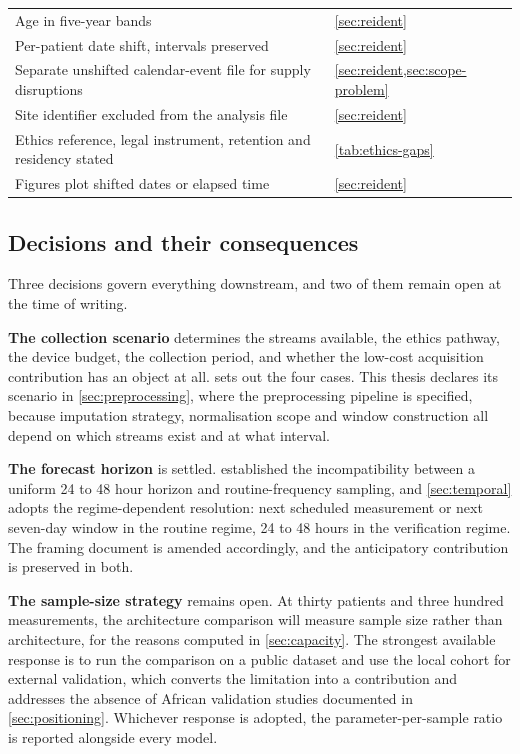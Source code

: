 \documentclass[12pt,a4paper,oneside]{report}
\begin{document}
\begin{table}[htbp]
\begin{tabularx}{\textwidth}{@{}X >{\raggedright\arraybackslash}p{5.5cm}@{}}
Age in five-year bands & \cref{sec:reident} \\
Per-patient date shift, intervals preserved & \cref{sec:reident} \\
Separate unshifted calendar-event file for supply disruptions & \cref{sec:reident,sec:scope-problem} \\
Site identifier excluded from the analysis file & \cref{sec:reident} \\
Ethics reference, legal instrument, retention and residency stated & \cref{tab:ethics-gaps} \\
Figures plot shifted dates or elapsed time & \cref{sec:reident} \\
\bottomrule
\end{tabularx}
\end{table}

\subsection{Decisions and their consequences}\label{sec:decisions}

Three decisions govern everything downstream, and two of them remain open at the time of writing.

\textbf{The collection scenario} determines the streams available, the ethics pathway, the device budget, the collection period, and whether the low-cost acquisition contribution has an object at all.  sets out the four cases. This thesis declares its scenario in \cref{sec:preprocessing}, where the preprocessing pipeline is specified, because imputation strategy, normalisation scope and window construction all depend on which streams exist and at what interval.

\textbf{The forecast horizon} is settled.  established the incompatibility between a uniform 24 to 48 hour horizon and routine-frequency sampling, and \cref{sec:temporal} adopts the regime-dependent resolution: next scheduled measurement or next seven-day window in the routine regime, 24 to 48 hours in the verification regime. The framing document is amended accordingly, and the anticipatory contribution is preserved in both.

\textbf{The sample-size strategy} remains open. At thirty patients and three hundred measurements, the architecture comparison will measure sample size rather than architecture, for the reasons computed in \cref{sec:capacity}. The strongest available response is to run the comparison on a public dataset and use the local cohort for external validation, which converts the limitation into a contribution and addresses the absence of African validation studies documented in \cref{sec:positioning}. Whichever response is adopted, the parameter-per-sample ratio is reported alongside every model.
\end{document}
